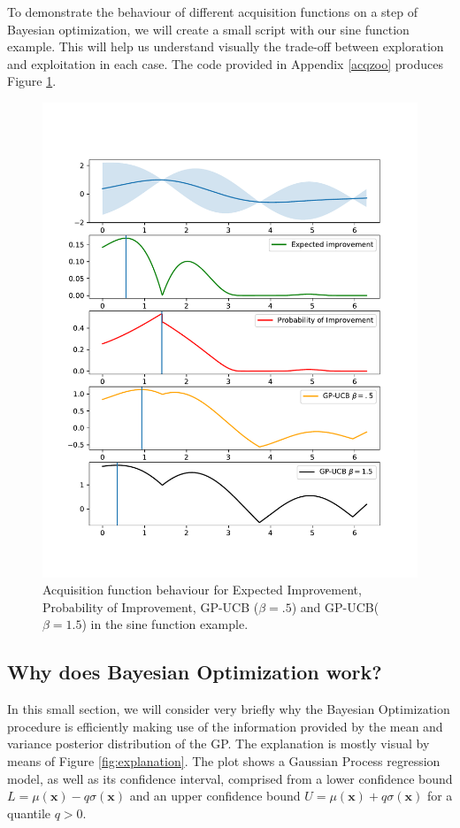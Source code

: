 \documentclass[10pt,a4paper,twoside]{book}
\begin{document}
To demonstrate the behaviour of different acquisition functions on a step of Bayesian optimization, we will create a small script with our sine function example. This will help us understand visually the trade-off between exploration and exploitation in each case. The code provided in Appendix \ref{acqzoo} produces Figure \ref{fig:acqzoo}.


\begin{figure}
\centering
\caption{Acquisition function behaviour for Expected Improvement, Probability of Improvement, GP-UCB ($\beta = .5$) and GP-UCB($\beta = 1.5$) in the sine function example.}
\label{fig:acqzoo}
\includegraphics[scale=.6]{figures/chapter3/acqzoo}
\end{figure}

\subsection{Why does Bayesian Optimization work?}

In this small section, we will consider very briefly why the Bayesian Optimization procedure is efficiently making use of the information provided by the mean and variance posterior distribution of the GP. The explanation is mostly visual by means of Figure \ref{fig:explanation}. The plot shows a Gaussian Process regression model, as well as its confidence interval, comprised from a lower confidence bound $L = \mu(\boldsymbol{x}) - q\sigma(\boldsymbol{x})$ and an upper confidence bound $U = \mu(\boldsymbol{x}) + q\sigma(\boldsymbol{x})$ for a quantile $q>0$.\\
\end{document}

